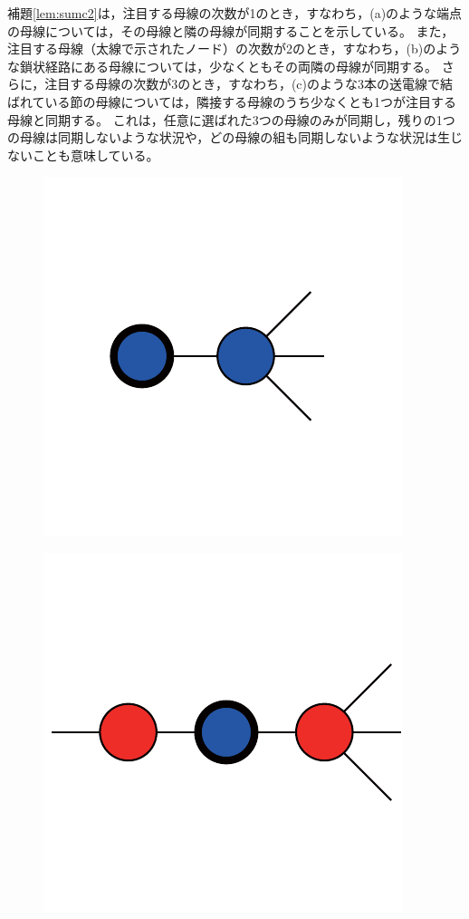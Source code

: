 \documentclass[tombow,dvipdfmx]{corona-a5-1.1}
\begin{document}
補題\ref{lem:sumc2}は，注目する母線の次数が1のとき，すなわち，(a)のような端点の母線については，その母線と隣の母線が同期することを示している。
また，注目する母線（太線で示されたノード）の次数が2のとき，すなわち，(b)のような鎖状経路にある母線については，少なくともその両隣の母線が同期する。
さらに，注目する母線の次数が3のとき，すなわち，(c)のような3本の送電線で結ばれている節の母線については，隣接する母線のうち少なくとも1つが注目する母線と同期する。
これは，任意に選ばれた3つの母線のみが同期し，残りの1つの母線は同期しないような状況や，どの母線の組も同期しないような状況は生じないことも意味している。

\begin{figure}[t]
  \centering
  {
  \begin{minipage}{0.3\linewidth}
    \centering
    \includegraphics[width = .60\linewidth]{figs/1degbus}
    \label{fig:N1} 
  \end{minipage}
  \begin{minipage}{0.3\linewidth}
    \centering
    \includegraphics[width = .60\linewidth]{figs/2degbus}

\end{minipage}}
\end{figure}
\end{document}

